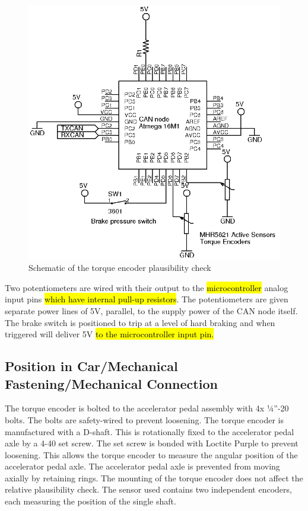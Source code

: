 \documentclass{article}
\DeclareRobustCommand{\hlr}[1]{{\sethlcolor{red}\hl{#1}}}
\begin{document}
        \begin{figure}[H]
            \centering
            \includegraphics{torquebrakecheck}
            \caption{Schematic of the torque encoder plausibility check}
            \label{braketorque}
        \end{figure}

        Two potentiometers are wired with their output to the \hlr{microcontroller} analog input pins \hlr{which have internal pull-up resistors}. The potentiometers are given separate power lines of 5V, parallel, to the supply power of the CAN node itself. The brake switch is positioned to trip at a level of hard braking and when triggered will deliver 5V \hlr{to the microcontroller input pin.}

    \subsection{Position in Car/Mechanical Fastening/Mechanical Connection}


        The torque encoder is bolted to the accelerator pedal assembly with 4x ¼”-20 bolts. The bolts are safety-wired to prevent loosening. The torque encoder is manufactured with a D-shaft. This is rotationally fixed to the accelerator pedal axle by a 4-40 set screw. The set screw is bonded with Loctite Purple to prevent loosening. This allows the torque encoder to measure the angular position of the accelerator pedal axle. The accelerator pedal axle is prevented from moving axially by retaining rings. The mounting of the torque encoder does not affect the relative plausibility check. The sensor used contains two independent encoders, each measuring the position of the single shaft.
\end{document}
